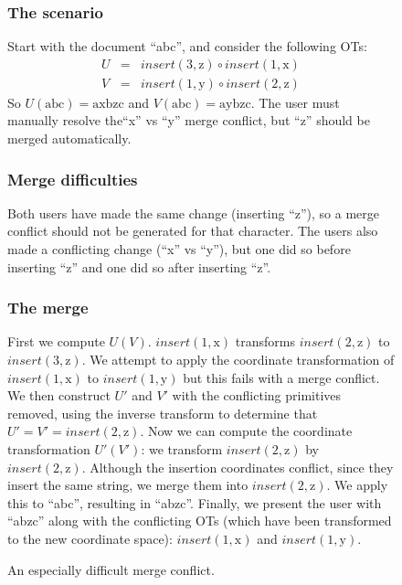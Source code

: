 \documentclass[11pt,titlepage]{article}
\begin{document}
\begin{figure}[h]
  \centering
  \begin{minipage}{\textwidth}
    \begin{multicols}{2}
      \subsubsection*{The scenario}
      Start with the document ``abc'', and consider the following OTs:
      \begin{eqnarray*}
        U &=& insert(3, \mathrm{z}) \circ insert(1, \mathrm{x}) \\
        V &=& insert(1, \mathrm{y}) \circ insert(2, \mathrm{z})
      \end{eqnarray*}
      So \(U(\mathrm{abc}) = \mathrm{axbzc}\) and \(V(\mathrm{abc}) =
      \mathrm{aybzc}\).  The user must manually resolve the``x'' vs
      ``y'' merge conflict, but ``z'' should be merged automatically.
      \subsubsection*{Merge difficulties}
      Both users have made the same change (inserting ``z''), so a
      merge conflict should not be generated for that character.  The
      users also made a conflicting change (``x'' vs ``y''), but one
      did so before inserting ``z'' and one did so after inserting
      ``z''.
      \subsubsection*{The merge}
      First we compute \(U(V)\). \(insert(1,\mathrm{x})\) transforms
      \(insert(2,\mathrm{z})\) to \(insert(3,\mathrm{z})\).  We
      attempt to apply the coordinate transformation of
      \(insert(1,\mathrm{x})\) to \(insert(1,\mathrm{y})\) but this
      fails with a merge conflict.  We then construct \(U'\) and
      \(V'\) with the conflicting primitives removed, using the
      inverse transform to determine that \(U' = V' = insert(2,
      \mathrm{z})\).  Now we can compute the coordinate transformation
      \(U'(V')\): we transform \(insert(2, \mathrm{z})\) by
      \(insert(2, \mathrm{z})\).  Although the insertion coordinates
      conflict, since they insert the same string, we merge them into
      \(insert(2, \mathrm{z})\).  We apply this to ``abc'', resulting
      in ``abzc''.  Finally, we present the user with ``abzc'' along
      with the conflicting OTs (which have been transformed to the new
      coordinate space): \(insert(1,\mathrm{x})\) and
      \(insert(1,\mathrm{y})\).
    \end{multicols}
  \end{minipage}
  \caption{An especially difficult merge conflict.}
  \label{fig:merge}
\end{figure}
\end{document}
